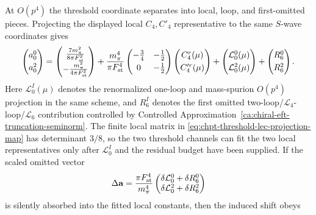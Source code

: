 \begin{controlledapproximation}
At \(O(p^4)\) the threshold coordinate separates into local, loop, and
first-omitted pieces.  Projecting the displayed local \(C_4,C'_4\) representative
to the same \(S\)-wave coordinates gives
\begin{equation}
  \begin{pmatrix}
    a_0^0\\[1mm] a_0^2
  \end{pmatrix}
  =
  \begin{pmatrix}
    \frac{7m_\pi^2}{8\pi F_{\rm st}^2}\\[1mm]
    -\frac{m_\pi^2}{4\pi F_{\rm st}^2}
  \end{pmatrix}
  +
  \frac{m_\pi^4}{\pi F_{\rm st}^4}
  \begin{pmatrix}
    -\frac34 & -\frac12\\[1mm]
    0 & -\frac12
  \end{pmatrix}
  \begin{pmatrix}
    C_4^r(\mu)\\[1mm] C_4^{\prime r}(\mu)
  \end{pmatrix}
  +
  \begin{pmatrix}
    \mathcal L_0^0(\mu)\\[1mm] \mathcal L_0^2(\mu)
  \end{pmatrix}
  +
  \begin{pmatrix}
    R_6^0\\[1mm] R_6^2
  \end{pmatrix}.
  \label{eq:chpt-threshold-lec-projection-map}
\end{equation}
Here \(\mathcal L_0^I(\mu)\) denotes the renormalized one-loop and mass-spurion
\(O(p^4)\) projection in the same scheme, and \(R_6^I\) denotes the first omitted
two-loop/\(\mathcal L_4\)-loop/\(\mathcal L_6\) contribution controlled by
Controlled Approximation~\ref{ca:chiral-eft-truncation-seminorm}.  The finite
local matrix in \eqref{eq:chpt-threshold-lec-projection-map} has determinant
\(3/8\), so the two threshold channels can fit the two local representatives
only after \(\mathcal L_0^I\) and the residual budget have been supplied.  If the
scaled omitted vector
\[
  \Delta\mathbf a
  =
  \frac{\pi F_{\rm st}^4}{m_\pi^4}
  \begin{pmatrix}
    \delta\mathcal L_0^0+\delta R_6^0\\
    \delta\mathcal L_0^2+\delta R_6^2
  \end{pmatrix}
\]
is silently absorbed into the fitted local constants, then the induced shift
obeys
\begin{equation}

\end{equation}
\end{controlledapproximation}
